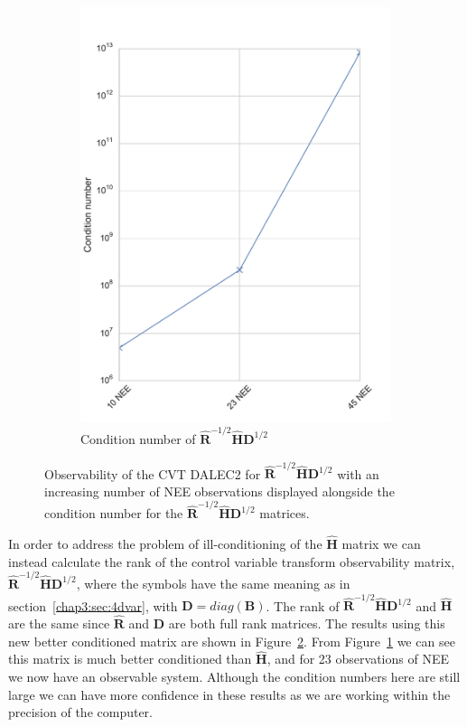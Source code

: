 \begin{figure}[ht]
\begin{subfigure}[b]{0.4\textwidth}
        \includegraphics[width=\textwidth]{chapter/chapter5/dalec2_obsrankcvtcond.pdf}
        \caption{Condition number of $\hat{\textbf{R}}^{-1/2}\hat{\textbf{H}}\textbf{D}^{1/2}$}
        \label{chap5:fig:D2_observabilitycondcvt}
    \end{subfigure}
    \caption{Observability of the CVT DALEC2 for $\hat{\textbf{R}}^{-1/2}\hat{\textbf{H}}\textbf{D}^{1/2}$ with an increasing number of NEE observations displayed alongside the condition number for the $\hat{\textbf{R}}^{-1/2}\hat{\textbf{H}}\textbf{D}^{1/2}$ matrices.}
    \label{chap5:fig:D2_cvtobservability}
\end{figure}

In order to address the problem of ill-conditioning of the $\hat{\textbf{H}}$ matrix we can instead calculate the rank of the control variable transform observability matrix, $\hat{\textbf{R}}^{-1/2}\hat{\textbf{H}}\textbf{D}^{1/2}$, where the symbols have the same meaning as in section~\ref{chap3:sec:4dvar}, with $\textbf{D} = diag(\textbf{B})$. The rank of $\hat{\textbf{R}}^{-1/2}\hat{\textbf{H}}\textbf{D}^{1/2}$ and $\hat{\textbf{H}}$ are the same since $\hat{\textbf{R}}$ and $\textbf{D}$ are both full rank matrices. The results using this new better conditioned matrix are shown in Figure~\ref{chap5:fig:D2_cvtobservability}. From Figure~\ref{chap5:fig:D2_observabilitycondcvt} we can see this matrix is much better conditioned than $\hat{\textbf{H}}$, and for 23 observations of NEE we now have an observable system. Although the condition numbers here are still large we can have more confidence in these results as we are working within the precision of the computer.

